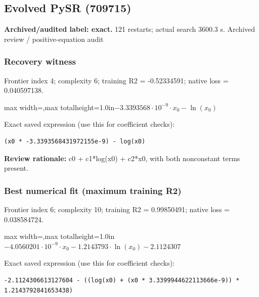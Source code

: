 \documentclass[10pt,letterpaper,landscape]{article}
\begin{document}
\begin{minipage}[t]{0.485\textwidth}
\subsection*{Evolved PySR (709715)}
\textbf{Archived/audited label: exact.} 121 restarts; actual search 3600.3 s.
{\small Archived review / positive-equation audit}
\subsubsection*{Recovery witness}
Frontier index 4; complexity 6; training R2 = -0.52334591; native loss = 0.040597138.
\begin{center}\begin{adjustbox}{max width=\linewidth,max totalheight=1.0in}$\displaystyle - 3.3393568 \cdot 10^{-9} \cdot x_{0} - \ln{\left(x_{0} \right)}$\end{adjustbox}\end{center}
{\scriptsize Exact saved expression (use this for coefficient checks):}
\begin{lstlisting}
(x0 * -3.3393568431972155e-9) - log(x0)
\end{lstlisting}
{\small\textbf{Review rationale:} c0 + c1*log(x0) + c2*x0, with both nonconstant terms present.}
\subsubsection*{Best numerical fit (maximum training R2)}
Frontier index 6; complexity 10; training R2 = 0.99850491; native loss = 0.038584724.
\begin{center}\begin{adjustbox}{max width=\linewidth,max totalheight=1.0in}$\displaystyle - 4.0560201 \cdot 10^{-9} \cdot x_{0} - 1.2143793 \cdot \ln{\left(x_{0} \right)} - 2.1124307$\end{adjustbox}\end{center}
{\scriptsize Exact saved expression (use this for coefficient checks):}
\begin{lstlisting}
-2.1124306613127604 - ((log(x0) + (x0 * 3.3399944622113666e-9)) * 1.2143792841653438)
\end{lstlisting}
\end{minipage}
\clearpage{}\label{schechter-10007}
\end{document}
